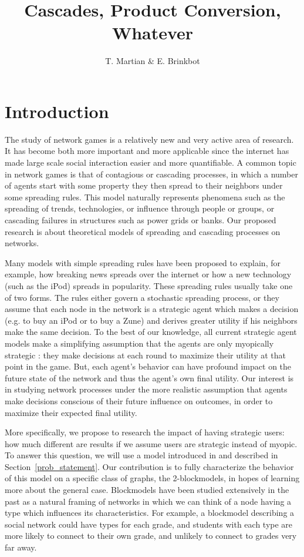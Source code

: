 \documentclass{article}
\title{Cascades, Product Conversion, Whatever}
\author{T. Martian \& E. Brinkbot}
\begin{document}
\maketitle

\section{Introduction}
\label{intro}

The study of network games is a relatively new and very active area of
research. It has become both more important and more applicable since
the internet has made large scale social interaction easier and more
quantifiable. A common topic in network games is that of contagious or
cascading processes, in which a number of agents start with some
property they then spread to their neighbors under some spreading
rules. This model naturally represents phenomena such as the spreading
of trends, technologies, or influence through people or groups, or
cascading failures in structures such as power grids or banks. Our
proposed research is about theoretical models of spreading and
cascading processes on networks.

Many models with simple spreading rules have been proposed
\cite{Arthur89, Morris00, Watts02} to explain, for example, how
breaking news spreads over the internet or how a new technology (such
as the iPod) spreads in popularity. These spreading rules usually take
one of two forms. The rules either govern a stochastic spreading
process, or they assume that each node in the network is a strategic
agent which makes a decision (e.g. to buy an iPod or to buy a Zune)
and derives greater utility if his neighbors make the same
decision. To the best of our knowledge, all current strategic agent
models make a simplifying assumption that the agents are only
myopically strategic \cite{Chierichetti12}: they make decisions at
each round to maximize their utility at that point in the game. But,
each agent's behavior can have profound impact on the future state of
the network and thus the agent's own final utility. Our interest is in
studying network processes under the more realistic assumption that
agents make decisions conscious of their future influence on outcomes,
in order to maximize their expected final utility.

More specifically, we propose to research the impact of having
strategic users: how much different are results if we assume users are
strategic instead of myopic. To answer this question, we will use a
model introduced in \cite{Chierichetti12} and described in
Section~\ref{prob_statement}. Our contribution is to fully
characterize the behavior of this model on a specific class of graphs,
the 2-blockmodels, in hopes of learning more about the general
case. Blockmodels have been studied extensively in the past
\cite{Wang87, Snijders97} as a natural framing of networks in which we
can think of a node having a type which influences its
characteristics. For example, a blockmodel describing a social network
could have types for each grade, and students with each type are more
likely to connect to their own grade, and unlikely to connect to
grades very far away.
\end{document}
